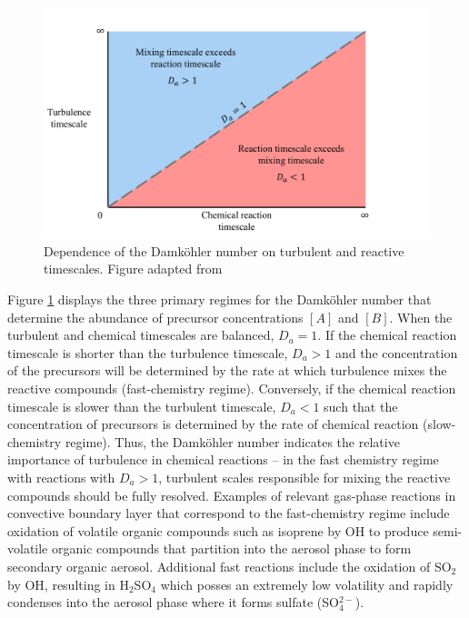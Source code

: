 \begin{figure}[h]
	\centering
	\includegraphics[width=\textwidth]{figures/chapter2/damkohler_number_figure.pdf}
	\caption{Dependence of the Damköhler number on turbulent and reactive timescales. Figure adapted from \textcite{kotamarthi_and_2017}}
	\label{fig:damkohler}
\end{figure}

Figure \ref{fig:damkohler} displays the three primary regimes for the Damköhler number that determine the abundance of precursor concentrations $[A]$ and $[B]$. When the turbulent and chemical timescales are balanced, $D_a = 1$. If the chemical reaction timescale is shorter than the turbulence timescale, $D_a >1$ and the concentration of the precursors will be determined by the rate at which turbulence mixes the reactive compounds (fast-chemistry regime). Conversely, if the chemical reaction timescale is slower than the turbulent timescale, $D_a<1$ such that the concentration of precursors is determined by the rate of chemical reaction (slow-chemistry regime). Thus, the Damköhler number indicates the relative importance of turbulence in chemical reactions -- in the fast chemistry regime with  reactions with $D_a > 1$, turbulent scales responsible for mixing the reactive compounds should be fully resolved. Examples of relevant gas-phase reactions in convective boundary layer that correspond to the fast-chemistry regime include oxidation of volatile organic compounds such as isoprene by OH to produce semi-volatile organic compounds that partition into the aerosol phase to form secondary organic aerosol. Additional fast reactions include the oxidation of SO$_2$ by OH, resulting in H$_2$SO$_4$ which posses an extremely low volatility and rapidly condenses into the aerosol phase where it forms sulfate (SO$_4^{2-}$). 

